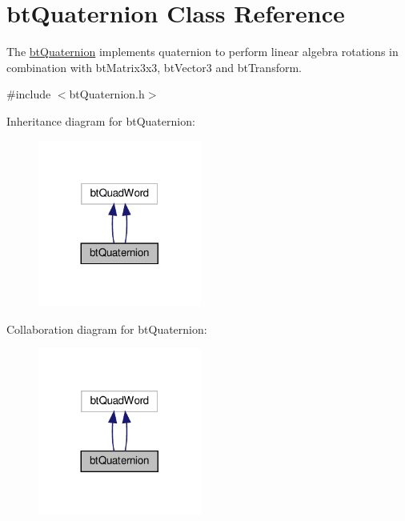 \hypertarget{classbtQuaternion}{}\section{bt\+Quaternion Class Reference}
\label{classbtQuaternion}


The \hyperlink{classbtQuaternion}{bt\+Quaternion} implements quaternion to perform linear algebra rotations in combination with bt\+Matrix3x3, bt\+Vector3 and bt\+Transform.  




{\ttfamily \#include $<$bt\+Quaternion.\+h$>$}



Inheritance diagram for bt\+Quaternion\+:
\nopagebreak
\begin{figure}[H]
\begin{center}
\leavevmode
\includegraphics[width=152pt]{classbtQuaternion__inherit__graph}
\end{center}
\end{figure}


Collaboration diagram for bt\+Quaternion\+:
\nopagebreak
\begin{figure}[H]
\begin{center}
\leavevmode
\includegraphics[width=152pt]{classbtQuaternion__coll__graph}
\end{center}
\end{figure}
